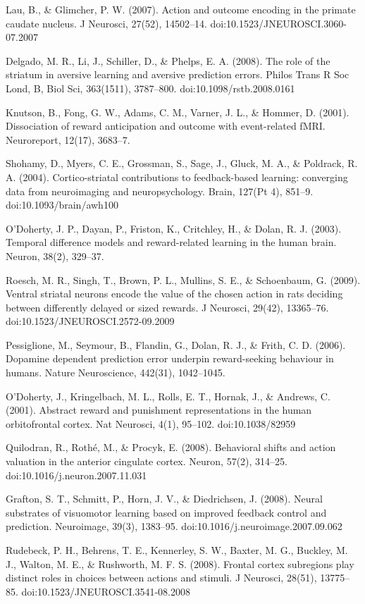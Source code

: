 Lau, B., & Glimcher, P. W. (2007). Action and outcome encoding in the primate caudate nucleus. J Neurosci, 27(52), 14502–14. doi:10.1523/JNEUROSCI.3060-07.2007

Delgado, M. R., Li, J., Schiller, D., & Phelps, E. A. (2008). The role of the striatum in aversive learning and aversive prediction errors. Philos Trans R Soc Lond, B, Biol Sci, 363(1511), 3787–800. doi:10.1098/rstb.2008.0161

Knutson, B., Fong, G. W., Adams, C. M., Varner, J. L., & Hommer, D. (2001). Dissociation of reward anticipation and outcome with event-related fMRI. Neuroreport, 12(17), 3683–7.

Shohamy, D., Myers, C. E., Grossman, S., Sage, J., Gluck, M. A., & Poldrack, R. A. (2004). Cortico-striatal contributions to feedback-based learning: converging data from neuroimaging and neuropsychology. Brain, 127(Pt 4), 851–9. doi:10.1093/brain/awh100

O'Doherty, J. P., Dayan, P., Friston, K., Critchley, H., & Dolan, R. J. (2003). Temporal difference models and reward-related learning in the human brain. Neuron, 38(2), 329–37.

Roesch, M. R., Singh, T., Brown, P. L., Mullins, S. E., & Schoenbaum, G. (2009). Ventral striatal neurons encode the value of the chosen action in rats deciding between differently delayed or sized rewards. J Neurosci, 29(42), 13365–76. doi:10.1523/JNEUROSCI.2572-09.2009

Pessiglione, M., Seymour, B., Flandin, G., Dolan, R. J., & Frith, C. D. (2006). Dopamine dependent prediction error underpin reward-seeking behaviour in humans. Nature Neuroscience, 442(31), 1042–1045.

O'Doherty, J., Kringelbach, M. L., Rolls, E. T., Hornak, J., & Andrews, C. (2001). Abstract reward and punishment representations in the human orbitofrontal cortex. Nat Neurosci, 4(1), 95–102. doi:10.1038/82959

Quilodran, R., Rothé, M., & Procyk, E. (2008). Behavioral shifts and action valuation in the anterior cingulate cortex. Neuron, 57(2), 314–25. doi:10.1016/j.neuron.2007.11.031

Grafton, S. T., Schmitt, P., Horn, J. V., & Diedrichsen, J. (2008). Neural substrates of visuomotor learning based on improved feedback control and prediction. Neuroimage, 39(3), 1383–95. doi:10.1016/j.neuroimage.2007.09.062

Rudebeck, P. H., Behrens, T. E., Kennerley, S. W., Baxter, M. G., Buckley, M. J., Walton, M. E., & Rushworth, M. F. S. (2008). Frontal cortex subregions play distinct roles in choices between actions and stimuli. J Neurosci, 28(51), 13775–85. doi:10.1523/JNEUROSCI.3541-08.2008


